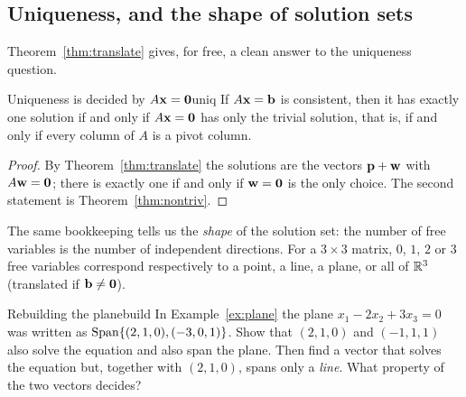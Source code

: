 \documentclass[11pt]{article}
\begin{document}
\subsection*{Uniqueness, and the shape of solution sets}

Theorem~\ref{thm:translate} gives, for free, a clean answer to the uniqueness question.

\begin{thm}{Uniqueness is decided by $A\mathbf{x}=\mathbf{0}$}{uniq}
If $A\mathbf{x}=\mathbf{b}$ is consistent, then it has exactly one solution if and only if $A\mathbf{x}=\mathbf{0}$ has only the trivial solution, that is, if and only if every column of $A$ is a pivot column.
\end{thm}

\begin{proof}
By Theorem~\ref{thm:translate} the solutions are the vectors $\mathbf{p}+\mathbf{w}$ with $A\mathbf{w}=\mathbf{0}$; there is exactly one if and only if $\mathbf{w}=\mathbf{0}$ is the only choice. The second statement is Theorem~\ref{thm:nontriv}.
\end{proof}

The same bookkeeping tells us the \emph{shape} of the solution set: the number of free variables is the number of independent directions. For a $3\times3$ matrix, $0$, $1$, $2$ or $3$ free variables
correspond respectively to a point, a line, a plane, or all of $\mathbb{R}^3$ (translated if $\mathbf{b}\neq\mathbf{0}$).

\begin{think}{Rebuilding the plane}{build}
In Example~\ref{ex:plane} the plane $x_1-2x_2+3x_3=0$ was written as $\operatorname{Span}\{(2,1,0),(-3,0,1)\}$. Show that $(2,1,0)$ and $(-1,1,1)$ also solve the equation and also span the plane. Then find a vector that solves the equation but, together with $(2,1,0)$, spans only a \emph{line}. What property of the two vectors decides?
\end{think}
\end{document}
